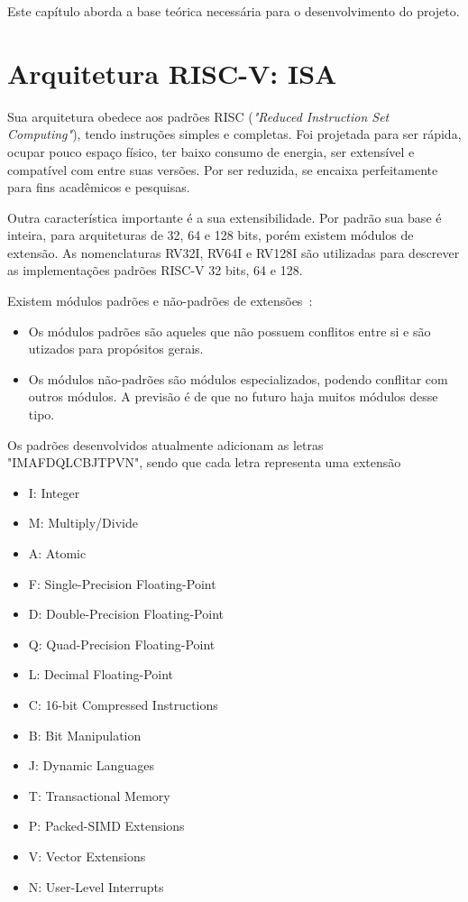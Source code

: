 Este capítulo aborda a base teórica necessária para o desenvolvimento do projeto.

\section{Arquitetura RISC-V: ISA}

	Sua arquitetura obedece aos padrões RISC (\textit{"Reduced Instruction Set Computing"}), tendo instruções simples e completas. Foi projetada para ser rápida, ocupar pouco espaço físico, ter baixo consumo de energia, ser extensível e compatível com entre suas versões. Por ser reduzida, se encaixa perfeitamente para fins acadêmicos e pesquisas. 

	Outra característica importante é a sua extensibilidade. Por padrão sua base é inteira, para arquiteturas de 32, 64 e 128 bits, porém existem módulos de extensão. As nomenclaturas RV32I, RV64I e RV128I são utilizadas para descrever as implementações padrões RISC-V 32 bits, 64 e 128.

	Existem módulos padrões e não-padrões de extensões~\cite{riscv_spec}:

		\begin{itemize}
			\item Os módulos padrões são aqueles que não possuem conflitos entre si e são utizados para propósitos gerais.
			\item Os módulos não-padrões são módulos especializados, podendo conflitar com outros módulos. A previsão é de que no futuro haja muitos módulos desse tipo.
		\end{itemize}

	Os padrões desenvolvidos atualmente adicionam as letras "IMAFDQLCBJTPVN", sendo que cada letra representa uma extensão

		\begin{itemize}
			\item I: Integer
			\item M: Multiply/Divide
			\item A: Atomic
			\item F: Single-Precision Floating-Point
			\item D: Double-Precision Floating-Point
			\item Q: Quad-Precision Floating-Point
			\item L: Decimal Floating-Point
			\item C: 16-bit Compressed Instructions
			\item B: Bit Manipulation
			\item J: Dynamic Languages
			\item T: Transactional Memory
			\item P: Packed-SIMD Extensions
			\item V: Vector Extensions 
			\item N: User-Level Interrupts 
		\end{itemize}


